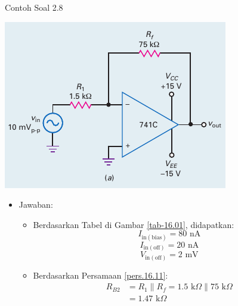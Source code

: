 \begin{frame}{Contoh Soal 2.8}
	\begin{multicols}{2}
		\begin{center}
			\includegraphics[width=\linewidth]{gambar/fig-16.17a}
		\end{center}
		\columnbreak
		\begin{itemize}
			\item Jawaban:
			\begin{itemize}
				\item Berdasarkan Tabel di Gambar \ref{tab-16.01}, didapatkan:
				\[ I_{\text{in}(\text{bias})} = 80 \text{ nA} \]
				\[ I_{\text{in}(\text{off})} = 20 \text{ nA} \]
				\[ V_{\text{in}(\text{off})} = 2 \text{ mV} \]
				\item Berdasarkan Persamaan \ref{pers.16.11}:
				\begin{align*}
					R_{B2} &= R_1 \parallel R_f = 1.5 \text{ k}\Omega \parallel 75 \text{ k}\Omega \\
					&= 1.47 \text{ k}\Omega
				\end{align*}
			\end{itemize}
		\end{itemize}
	\end{multicols}
\end{frame}

